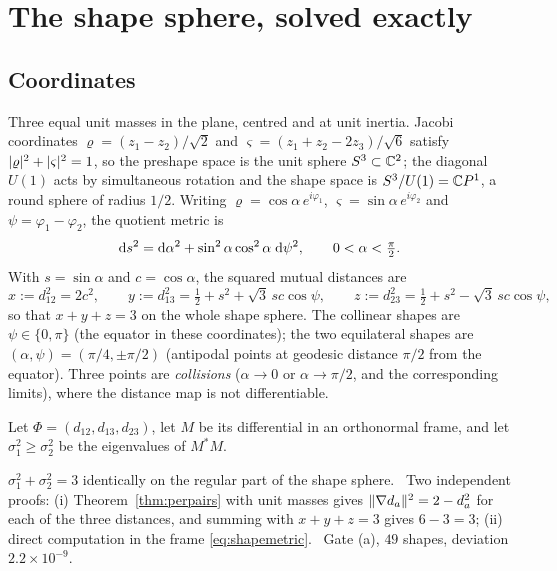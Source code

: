 \section{The shape sphere, solved exactly}\label{sec:shape}

\subsection{Coordinates}

Three equal unit masses in the plane, centred and at unit inertia. Jacobi coordinates
$\varrho=(z_1-z_2)/\sqrt2$ and $\varsigma=(z_1+z_2-2z_3)/\sqrt6$ satisfy
$\lvert\varrho\rvert^2+\lvert\varsigma\rvert^2=1$, so the preshape space is the unit sphere $S^3\subset\mathbb{C}^2$;
the diagonal $U(1)$ acts by simultaneous rotation and the shape space is
$S^3/U(1)=\mathbb{C} P^1$, a round sphere of radius $1/2$. Writing
$\varrho=\cos\alpha\,e^{i\varphi_1}$, $\varsigma=\sin\alpha\,e^{i\varphi_2}$ and
$\psi=\varphi_1-\varphi_2$, the quotient metric is
\begin{equation}\label{eq:shapemetric}
   \mathrm{d} s^2=\mathrm{d}\alpha^2+\sin^2\alpha\cos^2\alpha\;\mathrm{d}\psi^2,\qquad 0<\alpha<\tfrac\pi2 .
\end{equation}
With $s=\sin\alpha$ and $c=\cos\alpha$, the squared mutual distances are
\begin{equation}\label{eq:distances}
   x:=d_{12}^2=2c^2,\qquad
   y:=d_{13}^2=\tfrac12+s^2+\sqrt3\,sc\cos\psi,\qquad
   z:=d_{23}^2=\tfrac12+s^2-\sqrt3\,sc\cos\psi,
\end{equation}
so that $x+y+z=3$ on the whole shape sphere. The collinear shapes are $\psi\in\{0,\pi\}$ (the
equator in these coordinates); the two equilateral shapes are $(\alpha,\psi)=(\pi/4,\pm\pi/2)$
(antipodal points at geodesic distance $\pi/2$ from the equator). Three points are
\emph{collisions} ($\alpha\to0$ or $\alpha\to\pi/2$, and the corresponding limits), where the
distance map is not differentiable.

Let $\Phi=(d_{12},d_{13},d_{23})$, let $M$ be its differential in an orthonormal frame, and let
$\sigma_1^2\ge\sigma_2^2$ be the eigenvalues of $M^*M$.

\begin{theorem}\label{thm:shape-sum}
$\sigma_1^2+\sigma_2^2=3$ identically on the regular part of the shape sphere.
\T\ Two independent proofs: (i) Theorem~\ref{thm:perpairs} with unit masses gives
$\lVert\nabla d_a\rVert^2=2-d_a^2$ for each of the three distances, and summing with $x+y+z=3$ gives
$6-3=3$; (ii) direct computation in the frame \eqref{eq:shapemetric}. \V\ Gate
 (a), $49$ shapes, deviation $2.2\times10^{-9}$.
\end{theorem}

